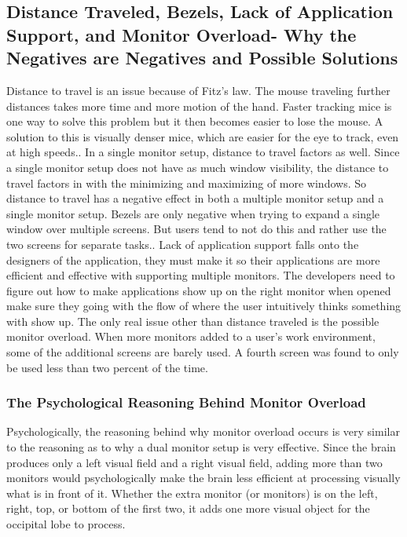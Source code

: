 \documentclass[a4paper]{article}
\begin{document}
\subsection{Distance Traveled, Bezels, Lack of Application Support, and Monitor Overload- Why the Negatives are Negatives and Possible Solutions}
Distance to travel is an issue because of Fitz's law. The mouse traveling further distances takes more time and more motion of the hand. Faster tracking mice is one way to solve this problem but it then becomes easier to lose the mouse. A solution to this is visually denser mice, which are easier for the eye to track, even at high speeds.\cite{Truemper}. In a single monitor setup, distance to travel factors as well. Since a single monitor setup does not have as much window visibility, the distance to travel factors in with the minimizing and maximizing of more windows. So distance to travel has a negative effect in both a multiple monitor setup and a single monitor setup. Bezels are only negative when trying to expand a single window over multiple screens. But users tend to not do this and rather use the two screens for separate tasks.\cite{Grudin}. Lack of application support falls onto the designers of the application, they must make it so their applications are more efficient and effective with supporting multiple monitors. The developers need to figure out how to make applications show up on the right monitor when opened make sure they going with the flow of where the user intuitively thinks something with show up.\cite{Grudin} The only real issue other than distance traveled is the possible monitor overload. When more monitors added to a user's work environment, some of the additional screens are barely used. A fourth screen was found to only be used less than two percent of the time.\cite{Truemper}
\subsubsection{The Psychological Reasoning Behind Monitor Overload}
Psychologically, the reasoning behind why monitor overload occurs is very similar to the reasoning as to why a dual monitor setup is very effective. Since the brain produces only a left visual field and a right visual field, adding more than two monitors would psychologically make the brain less efficient at processing visually what is in front of it. Whether the extra monitor (or monitors) is on the left, right, top, or bottom of the first two, it adds one more visual object for the occipital lobe to process.
\end{document}
